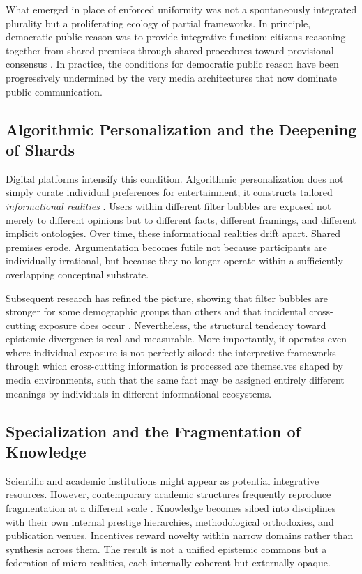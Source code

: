 \documentclass[12pt]{article}
\theoremstyle{definition}
\theoremstyle{plain}
\begin{document}
What emerged in place of enforced uniformity was not a spontaneously integrated plurality but a proliferating ecology of partial frameworks. In principle, democratic public reason was to provide integrative function: citizens reasoning together from shared premises through shared procedures toward provisional consensus \citep{Rawls1993}. In practice, the conditions for democratic public reason have been progressively undermined by the very media architectures that now dominate public communication.

\subsection{Algorithmic Personalization and the Deepening of Shards}

Digital platforms intensify this condition. Algorithmic personalization does not simply curate individual preferences for entertainment; it constructs tailored \emph{informational realities} \citep{Pariser2011}. Users within different filter bubbles are exposed not merely to different opinions but to different facts, different framings, and different implicit ontologies. Over time, these informational realities drift apart. Shared premises erode. Argumentation becomes futile not because participants are individually irrational, but because they no longer operate within a sufficiently overlapping conceptual substrate.

Subsequent research has refined the picture, showing that filter bubbles are stronger for some demographic groups than others and that incidental cross-cutting exposure does occur \citep{Guess2018}. Nevertheless, the structural tendency toward epistemic divergence is real and measurable. More importantly, it operates even where individual exposure is not perfectly siloed: the interpretive frameworks through which cross-cutting information is processed are themselves shaped by media environments, such that the same fact may be assigned entirely different meanings by individuals in different informational ecosystems.

\subsection{Specialization and the Fragmentation of Knowledge}

Scientific and academic institutions might appear as potential integrative resources. However, contemporary academic structures frequently reproduce fragmentation at a different scale \citep{Gibbons1994}. Knowledge becomes siloed into disciplines with their own internal prestige hierarchies, methodological orthodoxies, and publication venues. Incentives reward novelty within narrow domains rather than synthesis across them. The result is not a unified epistemic commons but a federation of micro-realities, each internally coherent but externally opaque.
\end{document}
